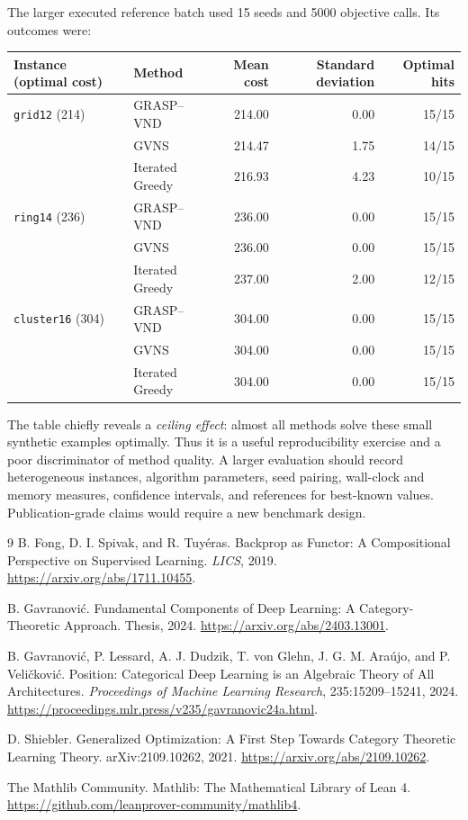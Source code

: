 \documentclass[11pt,a4paper]{article}
\begin{document}
The larger executed reference batch used 15 seeds and 5000 objective
calls. Its outcomes were:
\begin{center}
\small
\begin{tabular}{llrrr}
\toprule
Instance (optimal cost) & Method & Mean cost & Standard deviation & Optimal hits \\
\midrule
\texttt{grid12} (214) & GRASP--VND & 214.00 & 0.00 & 15/15 \\
 & GVNS & 214.47 & 1.75 & 14/15 \\
 & Iterated Greedy & 216.93 & 4.23 & 10/15 \\
\texttt{ring14} (236) & GRASP--VND & 236.00 & 0.00 & 15/15 \\
 & GVNS & 236.00 & 0.00 & 15/15 \\
 & Iterated Greedy & 237.00 & 2.00 & 12/15 \\
\texttt{cluster16} (304) & GRASP--VND & 304.00 & 0.00 & 15/15 \\
 & GVNS & 304.00 & 0.00 & 15/15 \\
 & Iterated Greedy & 304.00 & 0.00 & 15/15 \\
\bottomrule
\end{tabular}
\end{center}

The table chiefly reveals a \emph{ceiling effect}: almost all methods
solve these small synthetic examples optimally. Thus it is a useful
reproducibility exercise and a poor discriminator of method quality.
A larger evaluation should record heterogeneous instances, algorithm
parameters, seed pairing, wall-clock and memory measures, confidence
intervals, and references for best-known values. Publication-grade claims
would require a new benchmark design.

\begin{thebibliography}{9}
B. Fong, D. I. Spivak, and R. Tuy\'eras.
\newblock Backprop as Functor: A Compositional Perspective on Supervised Learning.
\newblock \emph{LICS}, 2019. \url{https://arxiv.org/abs/1711.10455}.

B. Gavranovi\'c.
\newblock Fundamental Components of Deep Learning: A Category-Theoretic Approach.
\newblock Thesis, 2024. \url{https://arxiv.org/abs/2403.13001}.

B. Gavranovi\'c, P. Lessard, A. J. Dudzik, T. von Glehn,
J. G. M. Ara\'ujo, and P. Veli\v{c}kovi\'c.
\newblock Position: Categorical Deep Learning is an Algebraic Theory of All Architectures.
\newblock \emph{Proceedings of Machine Learning Research}, 235:15209--15241, 2024.
\newblock \url{https://proceedings.mlr.press/v235/gavranovic24a.html}.

D. Shiebler.
\newblock Generalized Optimization: A First Step Towards Category Theoretic Learning Theory.
\newblock arXiv:2109.10262, 2021. \url{https://arxiv.org/abs/2109.10262}.

The Mathlib Community.
\newblock Mathlib: The Mathematical Library of Lean 4.
\newblock \url{https://github.com/leanprover-community/mathlib4}.
\end{thebibliography}
\end{document}
